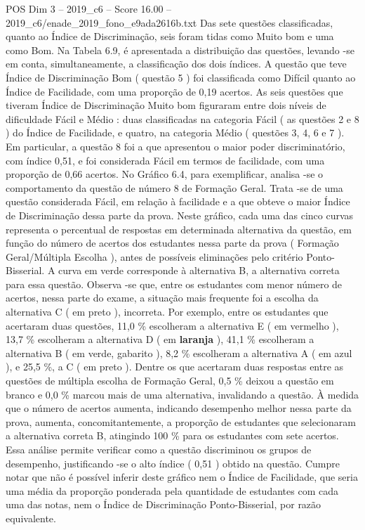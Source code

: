 \begin{textsample}{POS Dim 3 – 2019\_c6 – Score 16.00 – 2019\_c6/enade\_2019\_fono\_e9ada2616b.txt}
Das sete questões classificadas, quanto ao Índice de Discriminação, seis foram tidas como Muito bom e uma como Bom.
Na Tabela 6.9, é apresentada a distribuição das questões, levando -se em conta, simultaneamente, a classificação dos dois índices.
A questão que teve Índice de Discriminação Bom ( questão 5 ) foi classificada como Difícil quanto ao Índice de Facilidade, com uma proporção de 0,19 acertos.
As seis questões que tiveram Índice de Discriminação Muito bom figuraram entre dois níveis de dificuldade Fácil e Médio : duas classificadas na categoria Fácil ( as questões 2 e 8 ) do Índice de Facilidade, e quatro, na categoria Médio ( questões 3, 4, 6 e 7 ).
Em particular, a questão 8 foi a que apresentou o maior poder discriminatório, com índice 0,51, e foi considerada Fácil em termos de facilidade, com uma proporção de 0,66 acertos.
No Gráfico 6.4, para exemplificar, analisa -se o comportamento da questão de número 8 de Formação Geral.
Trata -se de uma questão considerada Fácil, em relação à facilidade e a que obteve o maior Índice de Discriminação dessa parte da prova.
Neste gráfico, cada uma das cinco curvas representa o percentual de respostas em determinada alternativa da questão, em função do número de acertos dos estudantes nessa parte da prova ( Formação Geral/Múltipla Escolha ), antes de possíveis eliminações pelo critério Ponto-Bisserial.
A curva em verde corresponde à alternativa B, a alternativa correta para essa questão.
Observa -se que, entre os estudantes com menor número de acertos, nessa parte do exame, a situação mais frequente foi a escolha da alternativa C ( em preto ), incorreta.
Por exemplo, entre os estudantes que acertaram duas questões, 11,0 \% escolheram a alternativa E ( em vermelho ), 13,7 \% escolheram a alternativa D ( em \textbf{laranja} ), 41,1 \% escolheram a alternativa B ( em verde, gabarito ), 8,2 \% escolheram a alternativa A ( em azul ), e 25,5 \%, a C ( em preto ).
Dentre os que acertaram duas respostas entre as questões de múltipla escolha de Formação Geral, 0,5 \% deixou a questão em branco e 0,0 \% marcou mais de uma alternativa, invalidando a questão.
À medida que o número de acertos aumenta, indicando desempenho melhor nessa parte da prova, aumenta, concomitantemente, a proporção de estudantes que selecionaram a alternativa correta B, atingindo 100 \% para os estudantes com sete acertos.
Essa análise permite verificar como a questão discriminou os grupos de desempenho, justificando -se o alto índice ( 0,51 ) obtido na questão.
Cumpre notar que não é possível inferir deste gráfico nem o Índice de Facilidade, que seria uma média da proporção ponderada pela quantidade de estudantes com cada uma das notas, nem o Índice de Discriminação Ponto-Bisserial, por razão equivalente.

\end{textsample}
